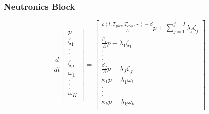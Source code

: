 \begin{frame}[fragile]
  \frametitle{Neutronics Block}
  \footnotesize{
\begin{equation} 
  \frac{d}{dt}\left[
    \begin{array}{c}
      p\\
      \zeta_1\\
      .\\
      .\\
      .\\
      \zeta_J\\
      \omega_1\\
      .\\
      .\\
      .\\
      \omega_K\\
    \end{array}
    \right]
    =
    \left[
      \begin{array}{ c }
        \frac{\rho(t,T_{fuel},T_{cool},\cdots)-\beta}{\Lambda}p + 
        \displaystyle\sum^{j=J}_{j=1}\lambda_j\zeta_j\\
        \frac{\beta_1}{\Lambda} p - \lambda_1\zeta_1\\
        .\\
        .\\
        .\\
        \frac{\beta_J}{\Lambda}p-\lambda_J\zeta_J\\
        \kappa_1p - \lambda_1\omega_1\\
        .\\
        .\\
        .\\
        \kappa_{k}p - \lambda_k\omega_{k}\\
      \end{array}
      \right]
      \label{eqn:ourPRKE}
    \end{equation}
  
  }
\end{frame}

